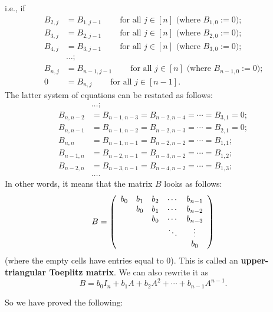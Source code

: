 \documentclass[numbers=enddot,12pt,final,onecolumn,notitlepage]{scrartcl}%
\numberwithin{exer}{subsection}
\theoremstyle{definition}
\begin{document}
i.e., if%
\begin{align*}
B_{2,j}  &  =B_{1,j-1}\ \ \ \ \ \ \ \ \ \ \text{for all }j\in\left[  n\right]
\text{ (where }B_{1,0}:=0\text{);}\\
B_{3,j}  &  =B_{2,j-1}\ \ \ \ \ \ \ \ \ \ \text{for all }j\in\left[  n\right]
\text{ (where }B_{2,0}:=0\text{);}\\
B_{4,j}  &  =B_{3,j-1}\ \ \ \ \ \ \ \ \ \ \text{for all }j\in\left[  n\right]
\text{ (where }B_{3,0}:=0\text{);}\\
&  \ldots;\\
B_{n,j}  &  =B_{n-1,j-1}\ \ \ \ \ \ \ \ \ \ \text{for all }j\in\left[
n\right]  \text{ (where }B_{n-1,0}:=0\text{);}\\
0  &  =B_{n,j}\ \ \ \ \ \ \ \ \ \ \text{for all }j\in\left[  n-1\right]  .
\end{align*}
The latter system of equations can be restated as follows:%
\begin{align*}
&  \ldots;\\
B_{n,n-2}  &  =B_{n-1,n-3}=B_{n-2,n-4}=\cdots=B_{3,1}=0;\\
B_{n,n-1}  &  =B_{n-1,n-2}=B_{n-2,n-3}=\cdots=B_{2,1}=0;\\
B_{n,n}  &  =B_{n-1,n-1}=B_{n-2,n-2}=\cdots=B_{1,1};\\
B_{n-1,n}  &  =B_{n-2,n-1}=B_{n-3,n-2}=\cdots=B_{1,2};\\
B_{n-2,n}  &  =B_{n-3,n-1}=B_{n-4,n-2}=\cdots=B_{1,3};\\
&  \ldots.
\end{align*}
In other words, it means that the matrix $B$ looks as follows:%
\[
B=\left(
\begin{array}
[c]{ccccc}%
b_{0} & b_{1} & b_{2} & \cdots & b_{n-1}\\
& b_{0} & b_{1} & \cdots & b_{n-2}\\
&  & b_{0} & \cdots & b_{n-3}\\
&  &  & \ddots & \vdots\\
&  &  &  & b_{0}%
\end{array}
\right)
\]
(where the empty cells have entries equal to $0$). This is called an
\textbf{upper-triangular Toeplitz matrix}. We can also rewrite it as%
\[
B=b_{0}I_{n}+b_{1}A+b_{2}A^{2}+\cdots+b_{n-1}A^{n-1}.
\]


So we have proved the following:
\end{document}
